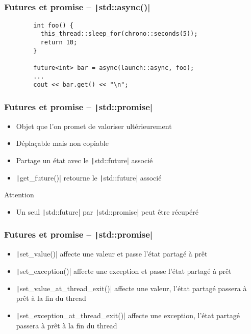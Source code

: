 \documentclass[C++.tex]{subfiles}
\begin{document}
\begin{frame}[fragile]
	\frametitle{Futures et promise -- \texttt|std::async()|}
	\begin{verbatim}
		int foo() {
		  this_thread::sleep_for(chrono::seconds(5));
		  return 10;
		}

		future<int> bar = async(launch::async, foo);
		...
		cout << bar.get() << "\n";
	\end{verbatim}
\end{frame}

\begin{frame}[fragile]
	\frametitle{Futures et promise -- \texttt|std::promise|}
	\begin{itemize}
		\item Objet que l'on promet de valoriser ultérieurement
		\item Déplaçable mais non copiable
		\item Partage un état avec le \texttt|std::future| associé
		\item \texttt|get_future()| retourne le \texttt|std::future| associé
	\end{itemize}

	\begin{alertblock}{Attention}
		\begin{itemize}
			\item Un seul \texttt|std::future| par \texttt|std::promise| peut être récupéré
		\end{itemize}
	\end{alertblock}
\end{frame}

\begin{frame}[fragile]
	\frametitle{Futures et promise -- \texttt|std::promise|}
	\begin{itemize}
		\item \texttt|set_value()| affecte une valeur et passe l'état partagé à prêt
		\item \texttt|set_exception()| affecte une exception et passe l'état partagé à prêt
		\item \texttt|set_value_at_thread_exit()| affecte une valeur, l'état partagé passera à prêt à la fin du thread
		\item \texttt|set_exception_at_thread_exit()| affecte une exception, l'état partagé passera à prêt à la fin du thread
	\end{itemize}
\end{frame}
\end{document}
